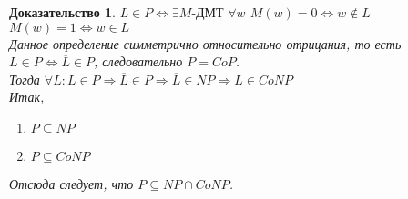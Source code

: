 \documentclass{beamer}
\theoremstyle{plain}
\newtheorem{proof-rus}[thm]{Доказательство}
\theoremstyle{definition}
\begin{document}
\begin{frame}
    \begin{proof-rus}
        $L \in P \Leftrightarrow \exists M\text{-ДМТ }\forall w$
            $M(w) = 0 \Leftrightarrow w \notin L$ \\
            \hspace{111px}$M(w) = 1 \Leftrightarrow w \in L$ \\
        Данное определение симметрично относительно отрицания, то есть $L \in P \Leftrightarrow \overline{L} \in P$, следовательно $P=CoP$. \\
        Тогда $\forall L : L \in P \Rightarrow \overline{L} \in P \Rightarrow \overline{L} \in NP \Rightarrow L \in CoNP$ \\
        Итак,
        \begin{enumerate}
            \item $P \subseteq NP$
            \item $P \subseteq CoNP$
        \end{enumerate}
        Отсюда следует, что $P \subseteq NP \cap CoNP$.
    \end{proof-rus}
\end{frame}
\end{document}
